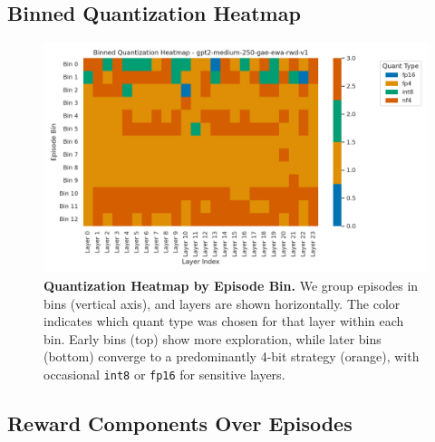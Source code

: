 \documentclass{article}
\begin{document}
	\subsection{Binned Quantization Heatmap}
	\label{sec:medium-heatmap}
	
	\begin{figure}[ht]
		\centering
		\includegraphics[width=1.0\columnwidth]{gpt2-medium-250-gae-ewa-rwd-v1_quant_heatmap_binned.png}
		\caption{\small
			\textbf{Quantization Heatmap by Episode Bin.}
			We group episodes in bins (vertical axis), and layers are shown horizontally. 
			The color indicates which quant type was chosen for that layer within each bin. 
			Early bins (top) show more exploration, while later bins (bottom) converge to a predominantly 4-bit strategy (orange), with occasional \texttt{int8} or \texttt{fp16} for sensitive layers.
		}
		\label{fig:gpt2medium-binned-heatmap}
	\end{figure}
	
	\subsection{Reward Components Over Episodes}
	\label{sec:medium-rewards}
	
\end{document}
